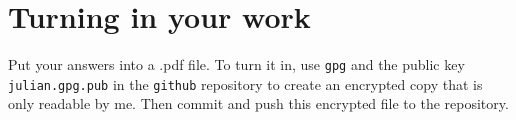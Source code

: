 \documentclass[11pt]{amsart}
\begin{document}


\bigskip
\section*{Turning in your work}

Put your answers into a .pdf file. To turn it in, use \texttt{gpg} and the public key \texttt{julian.gpg.pub} in the \texttt{github} repository to create an encrypted copy that is only readable by me. Then commit and push this encrypted file to the repository.
\end{document}

